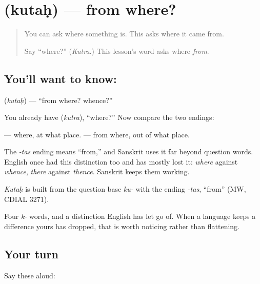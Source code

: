\section[\texorpdfstring{\sk{कुतः} (kutaḥ)}{कुतः (kutaḥ)}]{ (kutaḥ) — from where?}

\label{lesson:SA-C18-from-where}



\begin{quote}
You can ask where something is. This asks where it came from.

Say \textquotedblleft{}where?\textquotedblright{} (\emph{Kutra}.) This lesson's word asks where \emph{from}.
\end{quote}

\subsection*{You'll want to know: }
\textbf{} (\emph{kutaḥ}) — \textquotedblleft{}from where? whence?\textquotedblright{}

You already have \textbf{} (\emph{kutra}), \textquotedblleft{}where?\textquotedblright{} Now compare the two endings:

\emph{} — where, at what place. \emph{} — from where, out of what place.

The \emph{-tas} ending means \textquotedblleft{}from,\textquotedblright{} and Sanskrit uses it far beyond question words. English once had this distinction too and has mostly lost it: \emph{where} against \emph{whence}, \emph{there} against \emph{thence}. Sanskrit keeps them working.

\begin{cousinweb}
\emph{Kutaḥ} is built from the question base \emph{ku-} with the ending \emph{-tas}, \textquotedblleft{}from\textquotedblright{} (MW, CDIAL 3271).
\end{cousinweb}

\begin{grammarlens}[title={What you've built}]
Four \emph{k-} words, and a distinction English has let go of. When a language keeps a difference yours has dropped, that is worth noticing rather than flattening.
\end{grammarlens}

\subsection*{Your turn}
Say these aloud:

